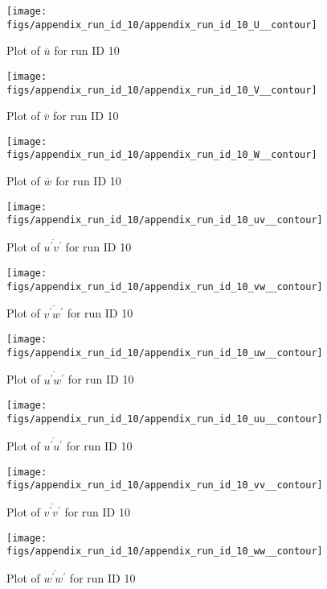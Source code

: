 \begin{figure}[H]
\centering
\texttt{[image: figs/appendix\_run\_id\_10/appendix\_run\_id\_10\_U\_\_contour]}
\caption{Plot of $\overline{u}$ for run ID 10}
\label{fig:appendix_run_id_10_U__contour}
\end{figure}


\begin{figure}[H]
\centering
\texttt{[image: figs/appendix\_run\_id\_10/appendix\_run\_id\_10\_V\_\_contour]}
\caption{Plot of $\overline{v}$ for run ID 10}
\label{fig:appendix_run_id_10_V__contour}
\end{figure}


\begin{figure}[H]
\centering
\texttt{[image: figs/appendix\_run\_id\_10/appendix\_run\_id\_10\_W\_\_contour]}
\caption{Plot of $\overline{w}$ for run ID 10}
\label{fig:appendix_run_id_10_W__contour}
\end{figure}


\begin{figure}[H]
\centering
\texttt{[image: figs/appendix\_run\_id\_10/appendix\_run\_id\_10\_uv\_\_contour]}
\caption{Plot of $\overline{u^\prime v^\prime}$ for run ID 10}
\label{fig:appendix_run_id_10_uv__contour}
\end{figure}


\begin{figure}[H]
\centering
\texttt{[image: figs/appendix\_run\_id\_10/appendix\_run\_id\_10\_vw\_\_contour]}
\caption{Plot of $\overline{v^\prime w^\prime}$ for run ID 10}
\label{fig:appendix_run_id_10_vw__contour}
\end{figure}


\begin{figure}[H]
\centering
\texttt{[image: figs/appendix\_run\_id\_10/appendix\_run\_id\_10\_uw\_\_contour]}
\caption{Plot of $\overline{u^\prime w^\prime}$ for run ID 10}
\label{fig:appendix_run_id_10_uw__contour}
\end{figure}


\begin{figure}[H]
\centering
\texttt{[image: figs/appendix\_run\_id\_10/appendix\_run\_id\_10\_uu\_\_contour]}
\caption{Plot of $\overline{u^\prime u^\prime}$ for run ID 10}
\label{fig:appendix_run_id_10_uu__contour}
\end{figure}


\begin{figure}[H]
\centering
\texttt{[image: figs/appendix\_run\_id\_10/appendix\_run\_id\_10\_vv\_\_contour]}
\caption{Plot of $\overline{v^\prime v^\prime}$ for run ID 10}
\label{fig:appendix_run_id_10_vv__contour}
\end{figure}


\begin{figure}[H]
\centering
\texttt{[image: figs/appendix\_run\_id\_10/appendix\_run\_id\_10\_ww\_\_contour]}
\caption{Plot of $\overline{w^\prime w^\prime}$ for run ID 10}
\label{fig:appendix_run_id_10_ww__contour}
\end{figure}


